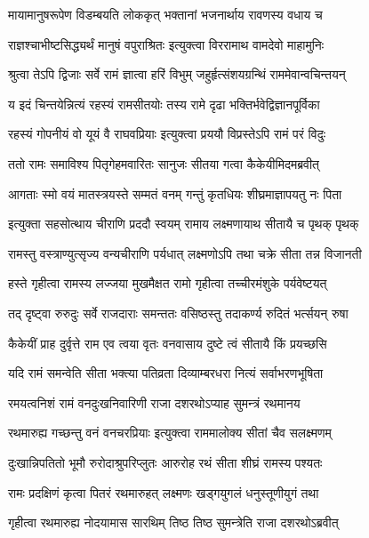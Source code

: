 \twolineshloka
{मायामानुषरूपेण विडम्बयति लोककृत्}
{भक्तानां भजनार्थाय रावणस्य वधाय च} %

\twolineshloka
{राज्ञश्चाभीष्टसिद्ध्यर्थं मानुषं वपुराश्रितः}
{इत्युक्त्वा विररामाथ वामदेवो माहामुनिः} %

\twolineshloka
{श्रुत्वा तेऽपि द्विजाः सर्वे रामं ज्ञात्वा हरिं विभुम्}
{जहुर्हृत्संशयग्रन्थिं राममेवान्वचिन्तयन्} %

\twolineshloka
{य इदं चिन्तयेन्नित्यं रहस्यं रामसीतयोः}
{तस्य रामे दृढा भक्तिर्भवेद्विज्ञानपूर्विका} %

\twolineshloka
{रहस्यं गोपनीयं वो यूयं वै राघवप्रियाः}
{इत्युक्त्वा प्रययौ विप्रस्तेऽपि रामं परं विदुः} %

\twolineshloka
{ततो रामः समाविश्य पितृगेहमवारितः}
{सानुजः सीतया गत्वा कैकेयीमिदमब्रवीत्} %

\twolineshloka
{आगताः स्मो वयं मातस्त्रयस्ते सम्मतं वनम्}
{गन्तुं कृतधियः शीघ्रमाज्ञापयतु नः पिता} %

\twolineshloka
{इत्युक्ता सहसोत्थाय चीराणि प्रददौ स्वयम्}
{रामाय लक्ष्मणायाथ सीतायै च पृथक् पृथक्} %

\twolineshloka
{रामस्तु वस्त्राण्युत्सृज्य वन्यचीराणि पर्यधात्}
{लक्ष्मणोऽपि तथा चक्रे सीता तन्न विजानती} %

\twolineshloka
{हस्ते गृहीत्वा रामस्य लज्जया मुखमैक्षत}
{रामो गृहीत्वा तच्चीरमंशुके पर्यवेष्टयत्} %

\twolineshloka
{तद् दृष्ट्वा रुरुदुः सर्वे राजदाराः समन्ततः}
{वसिष्ठस्तु तदाकर्ण्य रुदितं भर्त्सयन् रुषा} %

\twolineshloka
{कैकेयीं प्राह दुर्वृत्ते राम एव त्वया वृतः}
{वनवासाय दुष्टे त्वं सीतायै किं प्रयच्छसि} %

\twolineshloka
{यदि रामं समन्वेति सीता भक्त्या पतिव्रता}
{दिव्याम्बरधरा नित्यं सर्वाभरणभूषिता} %

\twolineshloka
{रमयत्वनिशं रामं वनदुःखनिवारिणी}
{राजा दशरथोऽप्याह सुमन्त्रं रथमानय} %

\twolineshloka
{रथमारुह्य गच्छन्तु वनं वनचरप्रियाः}
{इत्युक्त्वा राममालोक्य सीतां चैव सलक्ष्मणम्} %

\twolineshloka
{दुःखान्निपतितो भूमौ रुरोदाश्रुपरिप्लुतः}
{आरुरोह रथं सीता शीघ्रं रामस्य पश्यतः} %

\twolineshloka
{रामः प्रदक्षिणं कृत्वा पितरं रथमारुहत्}
{लक्ष्मणः खड्गयुगलं धनुस्तूणीयुगं तथा} %

\twolineshloka
{गृहीत्वा रथमारुह्य नोदयामास सारथिम्}
{तिष्ठ तिष्ठ सुमन्त्रेति राजा दशरथोऽब्रवीत्} %

